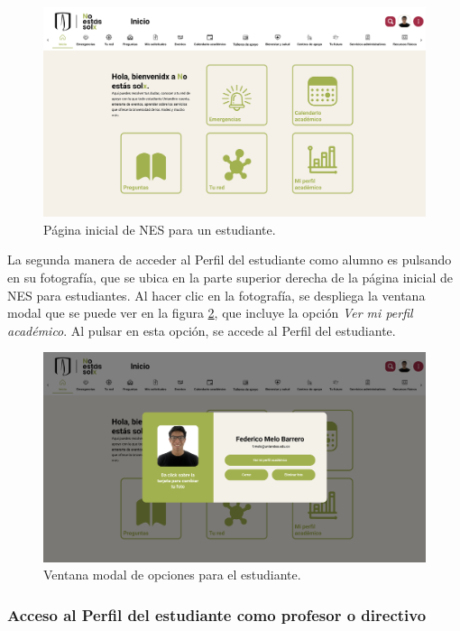 \begin{figure}[H]
	\includegraphics[width=\textwidth]{assets/nes/landing_estudiante.png}
	\caption{Página inicial de NES para un estudiante.}
	\label{fig:landing_estudiante}
\end{figure}

La segunda manera de acceder al Perfil del estudiante como alumno es pulsando en su fotografía, que se ubica en la parte superior derecha de la página inicial de \gls{NES} para estudiantes. Al hacer clic en la fotografía, se despliega la ventana modal que se puede ver en la figura \ref{fig:menu_estudiante}, que incluye la opción \textit{Ver mi perfil académico}. Al pulsar en esta opción, se accede al Perfil del estudiante.

\begin{figure}[H]
	\includegraphics[width=\textwidth]{assets/nes/menu_estudiante.png}
	\caption{Ventana modal de opciones para el estudiante.}
	\label{fig:menu_estudiante}
\end{figure}

\subsubsection{Acceso al Perfil del estudiante como profesor o directivo}

